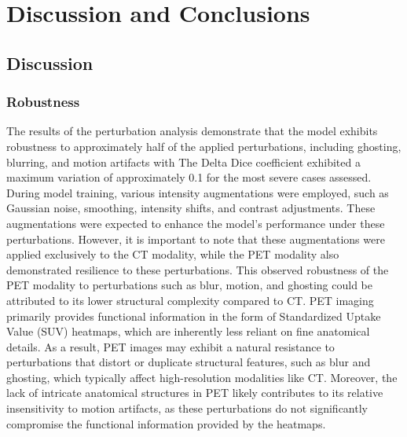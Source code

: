 %
%
%

\chapter{Discussion and Conclusions}

\section{Discussion}

\subsection{Robustness}

The results of the perturbation analysis demonstrate that the model exhibits robustness to approximately half of the applied perturbations, including ghosting, blurring, and motion artifacts with The Delta Dice coefficient exhibited a maximum variation of approximately 0.1 for the most severe cases assessed. During model training, various intensity augmentations were employed, such as Gaussian noise, smoothing, intensity shifts, and contrast adjustments. These augmentations were expected to enhance the model’s performance under these perturbations. However, it is important to note that these augmentations were applied exclusively to the CT modality, while the PET modality also demonstrated resilience to these perturbations.
This observed robustness of the PET modality to perturbations such as blur, motion, and ghosting could be attributed to its lower structural complexity compared to CT. PET imaging primarily provides functional information in the form of Standardized Uptake Value (SUV) heatmaps, which are inherently less reliant on fine anatomical details. As a result, PET images may exhibit a natural resistance to perturbations that distort or duplicate structural features, such as blur and ghosting, which typically affect high-resolution modalities like CT. Moreover, the lack of intricate anatomical structures in PET likely contributes to its relative insensitivity to motion artifacts, as these perturbations do not significantly compromise the functional information provided by the heatmaps.


